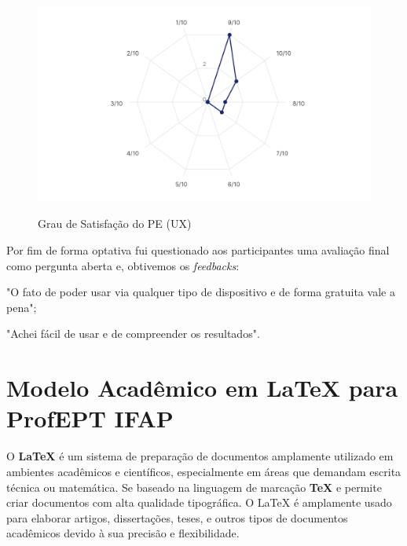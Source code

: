 \begin{figure}[h!]
    \caption{Grau de Satisfação do PE (UX)}
    \centering
    \includegraphics[scale=0.5]{figuras/resultados/satisfacao_ux.png}
    \label{fig:ux-13}
\end{figure}



Por fim de forma optativa fui questionado aos participantes uma avaliação final como pergunta aberta e, obtivemos os \textit{feedbacks}:

\begin{citacao}
    \item "O fato de poder usar via qualquer tipo de dispositivo e de forma gratuita vale a pena";
    \item "Achei fácil de usar e de compreender os resultados".
\end{citacao}













\section{Modelo Acadêmico em LaTeX para ProfEPT IFAP}
\label{model_latex}

O \textbf{LaTeX} é um sistema de preparação de documentos amplamente utilizado em ambientes acadêmicos e científicos, especialmente em áreas que demandam escrita técnica ou matemática. Se baseado na linguagem de marcação \textbf{TeX} e permite criar documentos com alta qualidade tipográfica. O LaTeX é amplamente usado para elaborar artigos, dissertações, teses, e outros tipos de documentos acadêmicos devido à sua precisão e flexibilidade.

